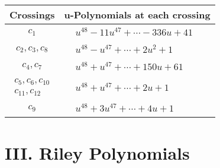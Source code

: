 \documentclass[1p]{elsarticle_modified}
\theoremstyle{definition}
\begin{document}
\begin{tabular}{m{50pt}|m{274pt}}
Crossings & \hspace{64pt}u-Polynomials at each crossing \\
\hline $$\begin{aligned}c_{1}\end{aligned}$$&$\begin{aligned}
&u^{48}-11 u^{47}+\cdots-336 u+41
\end{aligned}$\\
\hline $$\begin{aligned}c_{2},c_{3},c_{8}\end{aligned}$$&$\begin{aligned}
&u^{48}- u^{47}+\cdots+2 u^2+1
\end{aligned}$\\
\hline $$\begin{aligned}c_{4},c_{7}\end{aligned}$$&$\begin{aligned}
&u^{48}+u^{47}+\cdots+150 u+61
\end{aligned}$\\
\hline $$\begin{aligned}c_{5},c_{6},c_{10}\\c_{11},c_{12}\end{aligned}$$&$\begin{aligned}
&u^{48}+u^{47}+\cdots+2 u+1
\end{aligned}$\\
\hline $$\begin{aligned}c_{9}\end{aligned}$$&$\begin{aligned}
&u^{48}+3 u^{47}+\cdots+4 u+1
\end{aligned}$\\
\hline
\end{tabular}\newpage\renewcommand{\arraystretch}{1}
\centering \section*{ III. Riley Polynomials}
\end{document}
